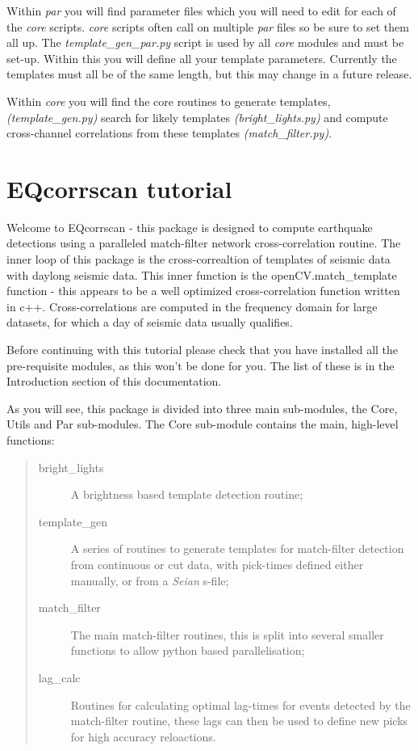 \documentclass[a4paper,10pt,english]{sphinxmanual}
\begin{document}
Within \emph{par} you will find parameter files which you will need to edit for
each of the \emph{core} scripts.  \emph{core} scripts often call on multiple \emph{par} files
so be sure to set them all up.  The \emph{template\_gen\_par.py} script is used by all
\emph{core} modules and must be set-up.  Within this you will define all your
template parameters.  Currently the templates must all be of the same length,
but this may change in a future release.

Within \emph{core} you will find the core routines to generate templates,
\emph{(template\_gen.py)} search for likely templates \emph{(bright\_lights.py)} and
compute cross-channel correlations from these templates \emph{(match\_filter.py)}.


\section{EQcorrscan tutorial}
\label{tutorial:eqcorrscan-tutorial}\label{tutorial::doc}
Welcome to EQcorrscan - this package is designed to compute earthquake detections
using a paralleled match-filter network cross-correlation routine.  The inner
loop of this package is the cross-correaltion of templates of seismic data
with daylong seismic data.  This inner function is the openCV.match\_template
function - this appears to be a well optimized cross-correlation function written
in c++.  Cross-correlations are computed in the frequency domain for large
datasets, for which a day of seismic data usually qualifies.

Before continuing with this tutorial please check that you have installed all
the pre-requisite modules, as this won't be done for you.  The list of these is
in the Introduction section of this documentation.

As you will see, this package is divided into three main sub-modules, the
Core, Utils and Par sub-modules.  The Core sub-module contains the main, high-level
functions:
\begin{quote}\begin{description}
\item[{bright\_lights}] \leavevmode
A brightness based template detection routine;

\item[{template\_gen}] \leavevmode
A series of routines to generate templates for match-filter detection
from continuous or cut data, with pick-times defined either manually, or from a
\emph{Seian} s-file;

\item[{match\_filter}] \leavevmode
The main match-filter routines, this is split into several
smaller functions to allow python based parallelisation;

\item[{lag\_calc}] \leavevmode
Routines for calculating optimal lag-times for events detected
by the match-filter routine, these lags can then be used to define new picks
for high accuracy reloactions.

\end{description}\end{quote}
\end{document}
